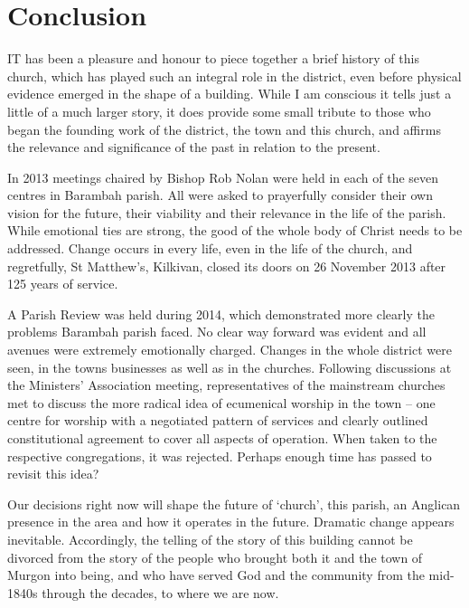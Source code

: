 \printendnotes[custom]
\setcounter{endnote}{0}
\chapter{Conclusion}
\nobalance


\lettrine[lines=3]{I}{T}
 has been a pleasure and honour to piece together a brief history of this church, which has played such an integral role in the district, even before physical evidence emerged in the shape of a building. While I am conscious it tells just a little of a much larger story, it does provide some small tribute to those who began the founding work of the district, the town and this church, and affirms the relevance and significance of the past in relation to the present.

In 2013 meetings chaired by Bishop Rob Nolan were held in each of the seven centres in Barambah parish. All were asked to prayerfully consider their own vision for the future, their viability and their relevance in the life of the parish. While emotional ties are strong, the good of the whole body of Christ needs to be addressed. Change occurs in every life, even in the life of the church, and regretfully, St Matthew's, Kilkivan, closed its doors on 26 November 2013 after 125 years of service.



A Parish Review was held during 2014, which demonstrated more clearly the problems Barambah parish faced. No clear way forward was evident and all avenues were extremely emotionally charged. Changes in the whole district were seen, in the towns businesses as well as in the churches. Following discussions at the Ministers' Association meeting, representatives of the mainstream churches met to discuss the more radical idea of ecumenical worship in the town -- one centre for worship with a negotiated pattern of services and clearly outlined constitutional agreement to cover all aspects of operation. When taken to the respective congregations, it was rejected. Perhaps enough time has passed to revisit this idea?



Our decisions right now will shape the future of `church', this parish, an Anglican presence in the area and how it operates in the future. Dramatic change appears inevitable. Accordingly, the telling of the story of this building cannot be divorced from the story of the people who brought both it and the town of Murgon into being, and who have served God and the community from the mid-1840s through the decades, to where we are now.



